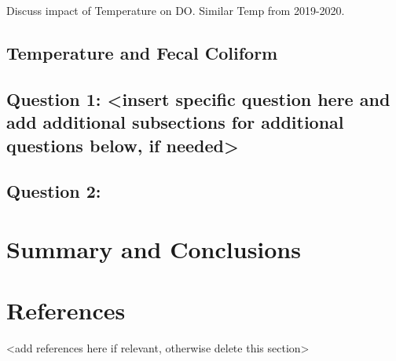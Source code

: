 \documentclass[
  12pt,
]{article}
\begin{document}
Discuss impact of Temperature on DO. Similar Temp from 2019-2020.

\hypertarget{temperature-and-fecal-coliform}{%
\subsection{Temperature and Fecal
Coliform}\label{temperature-and-fecal-coliform}}

\hypertarget{question-1-insert-specific-question-here-and-add-additional-subsections-for-additional-questions-below-if-needed}{%
\subsection{Question 1: \textless insert specific question here and add
additional subsections for additional questions below, if
needed\textgreater{}}\label{question-1-insert-specific-question-here-and-add-additional-subsections-for-additional-questions-below-if-needed}}

\hypertarget{question-2}{%
\subsection{Question 2:}\label{question-2}}

\newpage

\hypertarget{summary-and-conclusions}{%
\section{Summary and Conclusions}\label{summary-and-conclusions}}

\newpage

\hypertarget{references}{%
\section{References}\label{references}}

\textless add references here if relevant, otherwise delete this
section\textgreater{}
\end{document}
